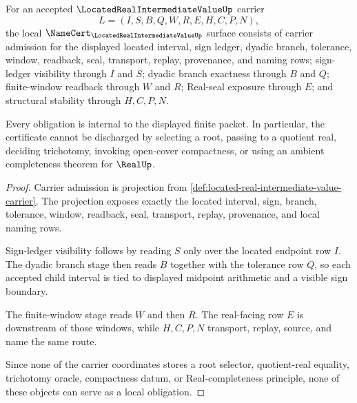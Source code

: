\begin{theorem}
\label{thm:located-real-intermediate-value-namecert-obligations}
For an accepted $\LocatedRealIntermediateValueUp$ carrier
$$
L=(I,S,B,Q,W,R,E,H,C,P,N),
$$
the local $\NameCert_{\LocatedRealIntermediateValueUp}$ surface consists of carrier admission for the displayed located interval, sign ledger, dyadic branch, tolerance, window, readback, seal, transport, replay, provenance, and naming rows; sign-ledger visibility through $I$ and $S$; dyadic branch exactness through $B$ and $Q$; finite-window readback through $W$ and $R$; Real-seal exposure through $E$; and structural stability through $H,C,P,N$.

Every obligation is internal to the displayed finite packet. In particular, the certificate cannot be discharged by selecting a root, passing to a quotient real, deciding trichotomy, invoking open-cover compactness, or using an ambient completeness theorem for $\RealUp$.
\end{theorem}
\begin{proof}
Carrier admission is projection from \autoref{def:located-real-intermediate-value-carrier}. The projection exposes exactly the located interval, sign, branch, tolerance, window, readback, seal, transport, replay, provenance, and local naming rows.

Sign-ledger visibility follows by reading $S$ only over the located endpoint row $I$. The dyadic branch stage then reads $B$ together with the tolerance row $Q$, so each accepted child interval is tied to displayed midpoint arithmetic and a visible sign boundary.

The finite-window stage reads $W$ and then $R$. The real-facing row $E$ is downstream of those windows, while $H,C,P,N$ transport, replay, source, and name the same route.

Since none of the carrier coordinates stores a root selector, quotient-real equality, trichotomy oracle, compactness datum, or Real-completeness principle, none of these objects can serve as a local obligation.
\end{proof}

